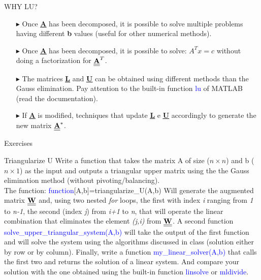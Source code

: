 \documentclass[xcolor={dvipsnames,rgb}, aspectratio=169]{beamer}
\begin{document}
\begin{frame}{WHY LU?}
\begin{itemize}
    \item[$\blacktriangleright$] Once \textbf{\underline{\underline{A}}} has been
       decomposed, it is possible to solve multiple problems having different \textbf{b}
       values (useful for other numerical methods).

    \item[$\blacktriangleright$] Once \textbf{\underline{\underline{A}}} has been
       decomposed, it is possible to solve: $A^{T}x = c$ without doing a factorization
       for $\textbf{\underline{\underline{A}}}^{T}$.

    \item[$\blacktriangleright$] The matrices \textbf{\underline{\underline{L}}} and
       \textbf{\underline{\underline{U}}} can be obtained using different methods than
       the Gauss elimination. Pay attention to the built-in function \textcolor{blue}{lu}
       of MATLAB (read the documentation).

    \item[$\blacktriangleright$] If \textbf{\underline{\underline{A}}} is modified,
       techniques that update \textbf{\underline{\underline{L}}} e
       \textbf{\underline{\underline{U}}} accordingly to generate the new matrix
       $\textbf{\underline{\underline{A}}}^{*}$.
\end{itemize}
\end{frame}

{%
\begin{frame}[standout]
	Exercises
\end{frame}
}

\begin{frame}{Triangularize U}
   Write a function that takes the matrix A of size ($n\times n$) and b ($n \times 1$) as
   the input and outputs a triangular upper matrix using the the Gauss elimination method
   (without pivoting/balancing). \\
   The function: \textcolor{blue}{function}[A,b]=triangularize\_U(A,b) Will generate the
   augmented matrix $\textbf{\underline{\underline{W}}}$ and, using two nested
   \textit{for} loops, the first with index \textit{i} ranging from \textit{1} to
   \textit{n-1}, the second (index \textit{j}) from \textit{i+1} to \textit{n}, that will
   operate the linear combination that eliminates the element \textit{(j,i)} from
   $\textbf{\underline{\underline{W}}}$. A second function
   \textcolor{blue}{solve\_upper\_triangular\_system(A,b)} will take the output of the
   first function and will solve the system using the algorithms discussed in class
   (solution either by row or by column). Finally, write a function
   \textcolor{blue}{my\_linear\_solver(A,b)} that calls the first two and returns the
   solution of a linear system. And compare your solution with the one obtained using the
   built-in function \textcolor{blue}{linsolve} or \textcolor{blue}{mldivide}.
\end{frame}
\end{document}
